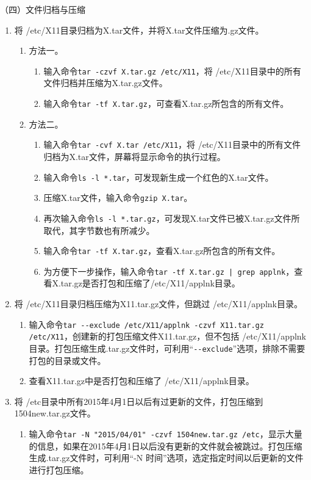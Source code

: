 \vspace{0.1in}
（四）文件归档与压缩
\begin{enumerate}
  \item 将 /etc/X11目录归档为X.tar文件，并将X.tar文件压缩为.gz文件。
    \begin{enumerate}
      \item 方法一。
	\begin{enumerate}
	  \item 输入命令\verb|tar -czvf X.tar.gz /etc/X11|，将 /etc/X11目录中的所有文件归档并压缩为X.tar.gz文件。
	  \item 输入命令\verb|tar -tf X.tar.gz|，可查看X.tar.gz所包含的所有文件。
	\end{enumerate}
      \item 方法二。
	\begin{enumerate}
	  \item 输入命令\verb|tar -cvf X.tar /etc/X11|，将 /etc/X11目录中的所有文件归档为X.tar文件，屏幕将显示命令的执行过程。
	  \item 输入命令\verb|ls -l *.tar|，可发现新生成一个红色的X.tar文件。
	  \item 压缩X.tar文件，输入命令\verb|gzip X.tar|。
	  \item 再次输入命令\verb|ls -l *.tar.gz|，可发现X.tar文件已被X.tar.gz文件所取代，其字节数也有所减少。
	  \item 输入命令\verb|tar -tf X.tar.gz|，查看X.tar.gz所包含的所有文件。
	  \item 为方便下一步操作，输入命令\verb=tar -tf X.tar.gz | grep applnk=，查看X.tar.gz是否打包和压缩了/etc/X11/applnk目录。
	\end{enumerate}
    \end{enumerate}
  \item 将 /etc/X11目录归档压缩为X11.tar.gz文件，但跳过 /etc/X11/applnk目录。
    \begin{enumerate}
      \item 输入命令\verb|tar --exclude /etc/X11/applnk -czvf X11.tar.gz /etc/X11|，创建新的打包压缩文件X11.tar.gz，但不包括 /etc/X11/applnk目录。打包压缩生成.tar.gz文件时，可利用“\verb|--exclude|”选项，排除不需要打包的目录或文件。
      \item 查看X11.tar.gz中是否打包和压缩了 /etc/X11/applnk目录。
    \end{enumerate}
  \item 将 /etc目录中所有2015年4月1日以后有过更新的文件，打包压缩到1504new.tar.gz文件。
    \begin{enumerate}
      \item 输入命令\verb|tar -N "2015/04/01" -czvf 1504new.tar.gz /etc|，显示大量的信息，如果在2015年4月1日以后没有更新的文件就会被跳过。打包压缩生成.tar.gz文件时，可利用“-N 时间”选项，选定指定时间以后更新的文件进行打包压缩。

\end{enumerate}
\end{enumerate}
